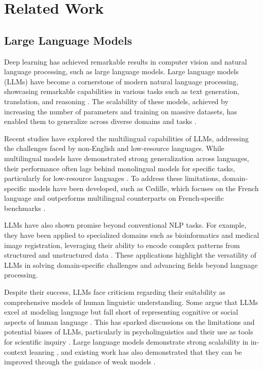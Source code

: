 \section{Related Work}
\subsection{Large Language Models}
Deep learning has achieved remarkable results in computer vision \cite{wang2024insectmamba} and natural language processing, such as large language models.
Large language models (LLMs) have become a cornerstone of modern natural language processing, showcasing remarkable capabilities in various tasks such as text generation, translation, and reasoning \cite{zhou2022claret}. The scalability of these models, achieved by increasing the number of parameters and training on massive datasets, has enabled them to generalize across diverse domains and tasks \cite{nicholas2023lost,zhou2024rethinking,muller2022cedille,zhou2025training}.

Recent studies have explored the multilingual capabilities of LLMs, addressing the challenges faced by non-English and low-resource languages. While multilingual models have demonstrated strong generalization across languages, their performance often lags behind monolingual models for specific tasks, particularly for low-resource languages \cite{chang2024goldfish,ojo2023african}. To address these limitations, domain-specific models have been developed, such as Cedille, which focuses on the French language and outperforms multilingual counterparts on French-specific benchmarks \cite{muller2022cedille}.

LLMs have also shown promise beyond conventional NLP tasks. For example, they have been applied to specialized domains such as bioinformatics and medical image registration, leveraging their ability to encode complex patterns from structured and unstructured data \cite{liu2024bioinformatics,ma2024llama}. These applications highlight the versatility of LLMs in solving domain-specific challenges and advancing fields beyond language processing.

Despite their success, LLMs face criticism regarding their suitability as comprehensive models of human linguistic understanding. Some argue that LLMs excel at modeling language but fall short of representing cognitive or social aspects of human language \cite{veres2022precis,grindrod2024modelling}. This has sparked discussions on the limitations and potential biases of LLMs, particularly in psycholinguistics and their use as tools for scientific inquiry \cite{houghton2023psycholinguistics}.
Large language models demonstrate strong scalability in in-context leanring \cite{zhou2024visual}, and existing work has also demonstrated that they can be improved through the guidance of weak models \cite{zhou2025weak}.

